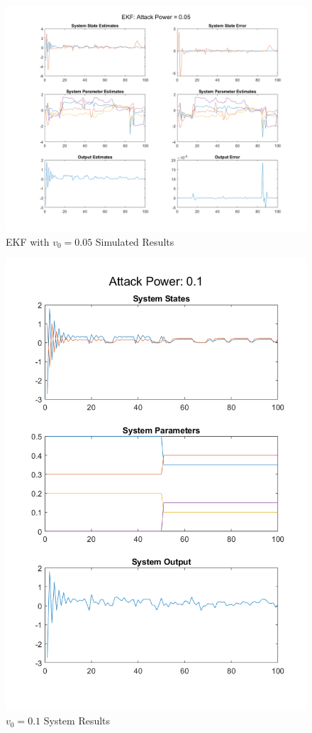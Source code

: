 \documentclass[]{ieeetran}
\begin{document}
\begin{figure}
	\centering
	\includegraphics[width=\linewidth]{../../fig/EKF_attack_0_05}
	\caption{EKF with $v_0 = 0.05$ Simulated Results}
	\label{fig:ekfattack005}
\end{figure}

\begin{figure}
	\centering
	\includegraphics[width=0.7\linewidth]{../../fig/SystemResponse_attack_0_1}
	\caption{$v_0 = 0.1$ System Results}
	\label{fig:systemresponseattack01}
\end{figure}
\end{document}
